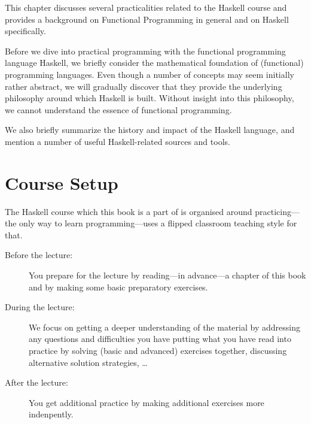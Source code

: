 
This chapter discusses several practicalities related to the Haskell course
and provides a background on Functional Programming in general and on Haskell
specifically.

Before we dive into practical programming with the functional programming language
Haskell, we briefly consider the mathematical foundation of (functional) programming
languages. Even though a number of concepts may seem initially rather
abstract, we will gradually discover that they provide the underlying philosophy
around which Haskell is built. Without insight into this philosophy, we cannot
understand the essence of functional programming.

We also briefly summarize
the history and impact of the Haskell language, and mention a number of
useful Haskell-related sources and tools.

\section{Course Setup}

The Haskell course which this book is a part of is organised around
practicing---the only way to learn programming---uses a flipped classroom
teaching style for that.
\begin{description}
\item[Before the lecture:]
You prepare for the lecture by reading---in
advance---a chapter of this book and by making some basic preparatory exercises. 
\item[During the lecture:]
We focus on getting a deeper understanding of the material by addressing any questions and difficulties you have putting what you have read into practice by solving (basic and advanced) exercises together, discussing alternative solution strategies, \ldots
\item[After the lecture:]
You get additional practice by making additional exercises more indenpently.
\end{description}

